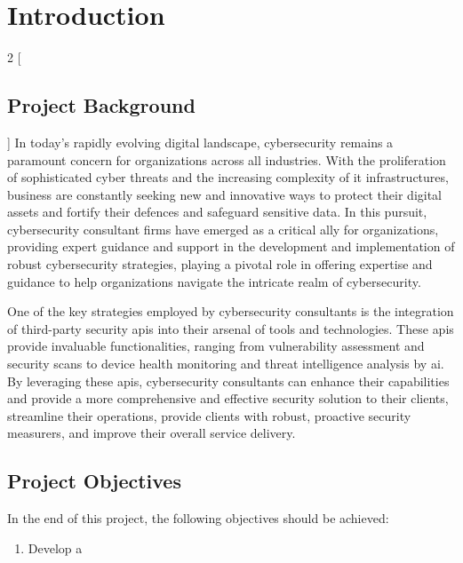 \chapter{Introduction}
\begin{multicols}{2}
    [\section{Project Background}]
    In today's rapidly evolving digital landscape, cybersecurity remains a paramount concern for organizations
    across all industries. With the proliferation of sophisticated cyber threats and the increasing complexity of
    \acrshort{it} infrastructures, business are constantly seeking new and innovative ways to protect their digital assets and
    fortify their defences and safeguard sensitive data. In this pursuit, cybersecurity consultant firms have
    emerged as a critical ally for organizations, providing expert guidance and support in the development and
    implementation of robust cybersecurity strategies, playing a pivotal role in offering expertise and guidance to
    help organizations navigate the intricate realm of cybersecurity.

    One of the key strategies employed by cybersecurity consultants is the integration of third-party security
    \acrshort{api}s into their arsenal of tools and technologies. These \acrshort{api}s provide invaluable
    functionalities, ranging from vulnerability assessment and security scans to device health monitoring and threat
    intelligence analysis by \acrshort{ai}. By leveraging these \acrshort{api}s, cybersecurity consultants can enhance
    their capabilities and provide a more comprehensive and effective security solution to their clients, streamline
    their operations, provide clients with robust, proactive security measurers, and improve their overall service delivery.

\end{multicols}
\section{Project Objectives}
In the end of this project, the following objectives should be achieved:
\begin{enumerate}
    \item Develop a
\end{enumerate}
